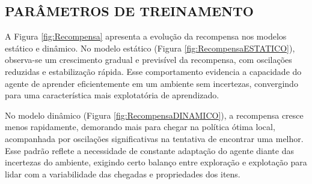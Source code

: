 \documentclass[
    12pt,                %
    openright,           %
    oneside,             %
    a4paper,             %
    english,             %
    spanish,             %
    brazil               %
]{ufscar}
\begin{document}
\subsection{PARÂMETROS DE TREINAMENTO}

A Figura \ref{fig:Recompensa} apresenta a evolução da recompensa nos modelos estático e dinâmico. No modelo estático (Figura \ref{fig:RecompensaESTATICO}), observa-se um crescimento gradual e previsível da recompensa, com oscilações reduzidas e estabilização rápida. Esse comportamento evidencia a capacidade do agente de aprender eficientemente em um ambiente sem incertezas, convergindo para uma característica mais explotatória de aprendizado.

No modelo dinâmico (Figura \ref{fig:RecompensaDINAMICO}), a recompensa cresce menos rapidamente, demorando mais para chegar na política ótima local, acompanhada por oscilações significativas na tentativa de encontrar uma melhor. Esse padrão reflete a necessidade de constante adaptação do agente diante das incertezas do ambiente, exigindo certo balanço entre exploração e explotação para lidar com a variabilidade das chegadas e propriedades dos itens.
\end{document}
